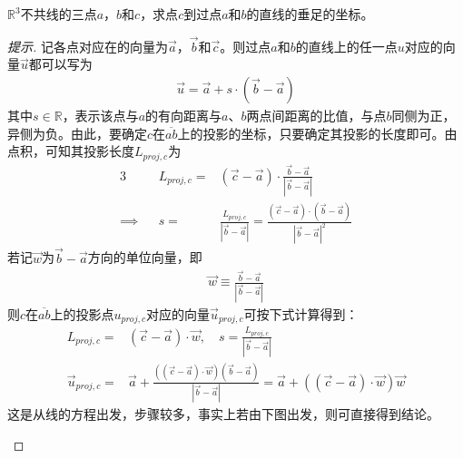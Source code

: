 \begin{example}[垂足坐标]
  $\mathbb{R}^3$不共线的三点$a$，$b$和$c$，求点$c$到过点$a$和$b$的直线的垂足的坐标。
\end{example}
\begin{proof}[提示]
  记各点对应在的向量为$\vec a$，$\vec b$和$\vec c$。则过点$a$和$b$的直线上的任一点$u$对应的向量$\vec u$都可以写为
  \begin{align*}
    \vec u=\vec a + s\cdot(\vec b-\vec a)
  \end{align*}
  其中$s\in\mathbb{R}$，表示该点与$a$的有向距离与$a$、$b$两点间距离的比值，与点$b$同侧为正，异侧为负。由此，要确定$c$在$\overline{ab}$上的投影的坐标，只要确定其投影的长度即可。由点积，可知其投影长度$L_{proj,c}$为
  \begin{alignat*}{3}
    &&L_{proj,c} ={}& (\vec c-\vec a)\cdot \frac{\vec b - \vec a}{\left| \vec b - \vec a \right|}\\
    \implies&& s ={}& \frac{L_{proj,c}}{\left| \vec b - \vec a \right|} =
    \frac{(\vec c-\vec a)\cdot(\vec b - \vec a)}{\left| \vec b - \vec a \right|^2}
  \end{alignat*}
  若记$\vec w$为$\vec b-\vec a$方向的单位向量，即
  \begin{align*}
    \vec w\equiv \frac{\vec b - \vec a}{\left| \vec b - \vec a \right|}
  \end{align*}
  则$c$在$\overline{ab}$上的投影点$u_{proj,c}$对应的向量$\vec u_{proj,c}$可按下式计算得到：
  \begin{align*}
    L_{proj,c} ={}& (\vec c-\vec a)\cdot \vec w, \quad
             s ={} \frac{L_{proj,c}}{\left| \vec b - \vec a \right|}\\
    \vec u_{proj,c}={}& \vec a + \frac{((\vec c-\vec a)\cdot\vec w)(\vec b-\vec a)}{\left| \vec b - \vec a \right|}
                        =\vec a + ((\vec c-\vec a)\cdot\vec w)\vec w
  \end{align*}
  这是从线的方程出发，步骤较多，事实上若由下图出发，则可直接得到结论。
  \begin{center}
\end{center}
\end{proof}
